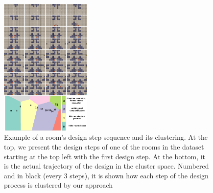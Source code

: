 
\begin{figure}
\centerline{\includegraphics[width=0.4\textwidth]{figures/figure3.png}}
\caption{
Example of a room's design step sequence and its clustering. At the top, we present the design steps of one of the rooms in the dataset starting at the top left with the first design step. At the bottom, it is the actual trajectory of the design in the cluster space. Numbered and in black (every 3 steps), it is shown how each step of the design process is clustered by our approach} \label{fig:paths-designers}
\end{figure}




